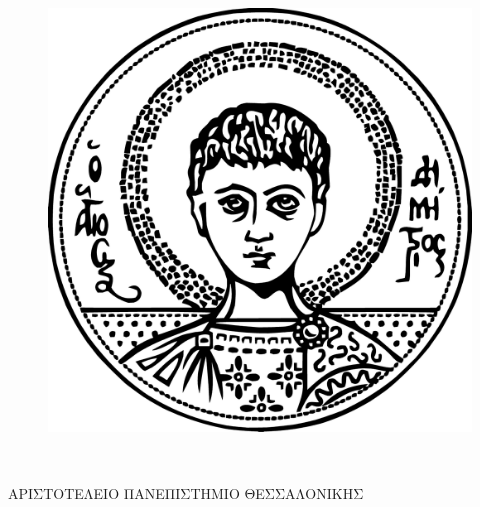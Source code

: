 
\begin{titlepage}

\newcommand{\HRule}{\rule{\linewidth}{0.5mm}} 

\center %
 

\begin{minipage}{0.13\textwidth}
        \begin{figure}[H]
            \centering
            \includegraphics[width=1\textwidth]{Title_Page/LogoAUTHblack300ppi.png}
        \end{figure}
    \end{minipage}
    ~
    \begin{minipage}{0.84\textwidth}
        \begin{center}
        \textsc{\Large ΑΡΙΣΤΟΤΕΛΕΙΟ ΠΑΝΕΠΙΣΤΗΜΙΟ ΘΕΣΣΑΛΟΝΙΚΗΣ}\\[0.1cm]

\end{center}
\end{minipage}
\end{titlepage}
